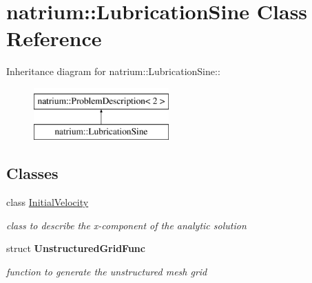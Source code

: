 \hypertarget{classnatrium_1_1LubricationSine}{
\section{natrium::LubricationSine Class Reference}
\label{classnatrium_1_1LubricationSine}
}
Inheritance diagram for natrium::LubricationSine::\begin{figure}[H]
\begin{center}
\leavevmode
\includegraphics[height=2cm]{classnatrium_1_1LubricationSine}
\end{center}
\end{figure}
\subsection*{Classes}
\begin{DoxyCompactItemize}
\item 
class \hyperlink{classnatrium_1_1LubricationSine_1_1InitialVelocity}{InitialVelocity}
\begin{DoxyCompactList}\small\item\em class to describe the x-\/component of the analytic solution \item\end{DoxyCompactList}\item 
struct {\bfseries UnstructuredGridFunc}
\begin{DoxyCompactList}\small\item\em function to generate the unstructured mesh grid \item\end{DoxyCompactList}\end{DoxyCompactItemize}
